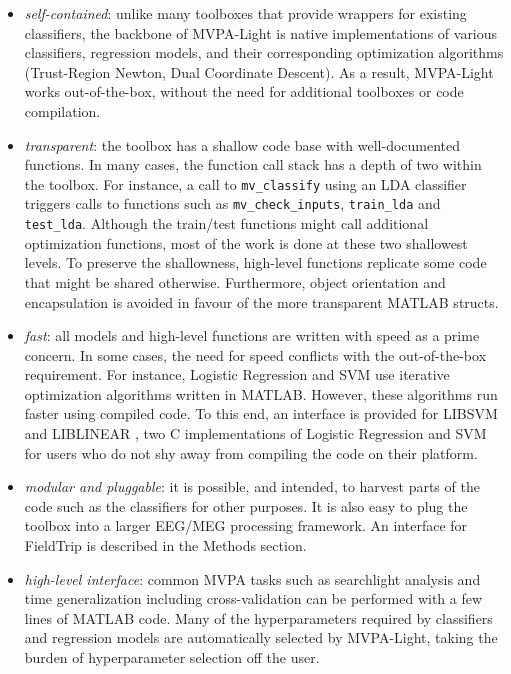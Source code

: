 \documentclass[utf8]{frontiersSCNS} %
\begin{document}
\begin{itemize}
\item \textit{self-contained}: unlike many toolboxes that provide wrappers for existing classifiers, the backbone of MVPA-Light is  native implementations of various classifiers, regression models, and their corresponding optimization algorithms (Trust-Region Newton, Dual Coordinate Descent). As a result, MVPA-Light works out-of-the-box, without the need for additional toolboxes or  code compilation.
\item \textit{transparent}: the toolbox has a shallow code base with well-documented functions. In many cases, the function call stack has a depth of two within the toolbox. For instance, a call to \texttt{mv\_classify} using an LDA classifier triggers calls to functions such as  \texttt{mv\_check\_inputs}, \texttt{train\_lda} and \texttt{test\_lda}. Although the train/test functions might call additional optimization functions, most of the work is done at these two shallowest levels. To preserve the shallowness, high-level functions replicate some code that might be shared otherwise. Furthermore, object orientation and encapsulation is avoided in favour of the more transparent MATLAB structs.
\item \textit{fast}: all models and high-level functions are written with speed as a prime concern. In some cases, the need for speed conflicts with the out-of-the-box requirement. For instance, Logistic Regression and SVM use iterative optimization algorithms written in MATLAB. However, these algorithms run faster using compiled code. To this end, an interface is provided for LIBSVM \citep{Chang2011LIBSVM:Machines} and LIBLINEAR \citep{Fan2008}, two C implementations of Logistic Regression and SVM for users who do not shy away from compiling the code on their platform.
\item \textit{modular and pluggable}: it is possible, and intended, to harvest parts of the code such as the classifiers for other purposes. It is also easy to plug the toolbox into a larger EEG/MEG processing framework. An interface for FieldTrip \citep{Oostenveld2011} is described in the Methods section.
\item \textit{high-level interface}: common MVPA tasks such as searchlight analysis and time generalization including cross-validation can be performed with a few lines of MATLAB code. Many of the hyperparameters required by classifiers and regression models are automatically selected by MVPA-Light, taking the burden of hyperparameter selection off the user.
\end{itemize}
\end{document}
